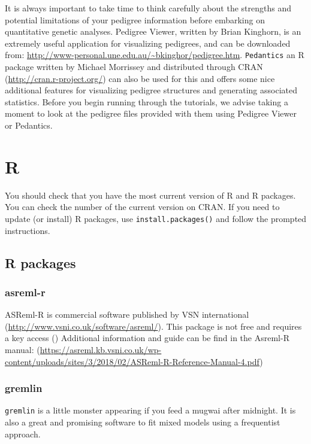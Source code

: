 \documentclass[
  12pt,
]{book}
\begin{document}
It is always important to take time to think carefully about the strengths and potential limitations of your pedigree information before embarking on quantitative genetic analyses. Pedigree Viewer, written by Brian Kinghorn, is an extremely useful application for visualizing pedigrees, and can be downloaded from: \url{http://www-personal.une.edu.au/~bkinghor/pedigree.htm}. \texttt{Pedantics} an R package written by Michael Morrissey and distributed through CRAN (\url{http://cran.r-project.org/}) can also be used for this and offers some nice additional features for visualizing pedigree structures and generating associated statistics. Before you begin running through the tutorials, we advise taking a moment to look at the pedigree files provided with them using Pedigree Viewer or Pedantics.

\hypertarget{r}{%
\section{R}\label{r}}

You should check that you have the most current version of R and R packages. You can check the number of the current version on CRAN. If you need to update (or install) R packages, use \texttt{install.packages()} and follow the prompted instructions.

\hypertarget{r-packages}{%
\subsection{R packages}\label{r-packages}}

\hypertarget{asreml-r}{%
\subsubsection{asreml-r}\label{asreml-r}}

ASReml-R is commercial software published by VSN international (\url{http://www.vsni.co.uk/software/asreml/}). This package is not free and requires a key access ()
Additional information and guide can be find in the Asreml-R manual: (\url{https://asreml.kb.vsni.co.uk/wp-content/uploads/sites/3/2018/02/ASReml-R-Reference-Manual-4.pdf})

\hypertarget{gremlin}{%
\subsubsection{gremlin}\label{gremlin}}

\texttt{gremlin} is a little monster appearing if you feed a mugwai after midnight. It is also a great and promising software to fit mixed models using a frequentist approach.
\end{document}
